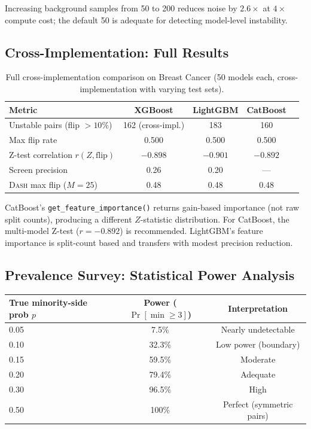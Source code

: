 \documentclass{article}
\newcommand{\DASH}{\textsc{Dash}}
\begin{document}
Increasing background samples from 50 to 200 reduces noise by $2.6\times$ at $4\times$ compute cost; the default 50 is adequate for detecting model-level instability.

\subsection{Cross-Implementation: Full Results}

\begin{table}[t]
\centering
\caption{Full cross-implementation comparison on Breast Cancer (50 models each, cross-implementation with varying test sets).}
\small
\begin{tabular}{@{}lcccc@{}}
\toprule
Metric & XGBoost & LightGBM & CatBoost \\
\midrule
Unstable pairs (flip $> 10\%$) & 162 (cross-impl.) & 183 & 160 \\
Max flip rate & 0.500 & 0.500 & 0.500 \\
Z-test correlation $r(Z, \text{flip})$ & $-0.898$ & $-0.901$ & $-0.892$ \\
Screen precision & 0.26 & 0.20 & --- \\
\DASH{} max flip ($M{=}25$) & 0.48 & 0.48 & 0.48 \\
\bottomrule
\end{tabular}
\end{table}

CatBoost's \texttt{get\_feature\_importance()} returns gain-based importance (not raw split counts), producing a different $Z$-statistic distribution. For CatBoost, the multi-model Z-test ($r = -0.892$) is recommended. LightGBM's feature importance is split-count based and transfers with modest precision reduction.

\subsection{Prevalence Survey: Statistical Power Analysis}

\begin{center}
\small
\begin{tabular}{@{}lcc@{}}
\toprule
True minority-side prob $p$ & Power ($\Pr[\min \geq 3]$) & Interpretation \\
\midrule
0.05 & 7.5\% & Nearly undetectable \\
0.10 & 32.3\% & Low power (boundary) \\
0.15 & 59.5\% & Moderate \\
0.20 & 79.4\% & Adequate \\
0.30 & 96.5\% & High \\
0.50 & 100\% & Perfect (symmetric pairs) \\
\bottomrule
\end{tabular}
\end{center}
\end{document}
